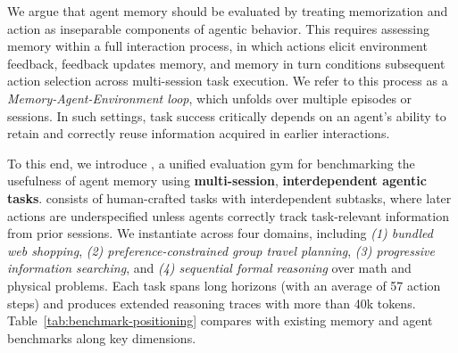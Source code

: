 

We argue that agent memory should be evaluated by treating memorization and action as inseparable components of agentic behavior. This requires assessing memory within a full interaction process, in which actions elicit environment feedback, feedback updates memory, and memory in turn conditions subsequent action selection across multi-session task execution. We refer to this process as a \textit{Memory-Agent-Environment loop}, which unfolds over multiple episodes or sessions. In such settings, task success critically depends on an agent’s ability to retain and correctly reuse information acquired in earlier interactions.

To this end,  we introduce \ours, a unified evaluation gym for benchmarking the usefulness of agent memory using \textbf{multi-session}, \textbf{interdependent agentic tasks}. \ours consists of human-crafted tasks with interdependent subtasks, where later actions are underspecified unless agents correctly track task-relevant information from prior sessions. We instantiate \ours across four domains, including \textit{(1) bundled web shopping}, \textit{(2) preference-constrained group travel planning}, \textit{(3) progressive information searching}, and \textit{(4) sequential formal reasoning} over math and physical problems. Each task spans long horizons (with an average of 57 action steps) and produces extended reasoning traces with more than 40k tokens. Table~\ref{tab:benchmark-positioning} compares \ours with existing memory and agent benchmarks along key dimensions.


